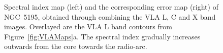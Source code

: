 \documentclass[fleqn,usenatbib]{mnras}
\def\fig{Figure}
\begin{document}
\begin{figure}
{\centering
{} \hspace{2em}

\caption{Spectral index map (left) and the corresponding error map (right) of NGC~5195, obtained through combining the VLA L, C and X band images. Overlayed are the VLA L band contours from \fig~\ref{fig:VLAMaps}a. The spectral index gradually increases outwards from the core towards the radio-arc.}
\label{fig:Specind}
}
\end{figure}
\end{document}
